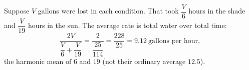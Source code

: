 Suppose $V$ gallons were lost in each condition. That took $\dfrac {V}{6}$ hours in the shade and $\dfrac {V}{19}$ hours in the sun. The average rate is total water over total time:
\[\dfrac{2V}{\dfrac {V}{6}+\dfrac {V}{19}}=\dfrac{2}{\dfrac{25}{114}}=\dfrac{228}{25}=\boxed{9.12}\ \text{gallons per hour},\]
the harmonic mean of $6$ and $19$ (not their ordinary average $12.5$).
